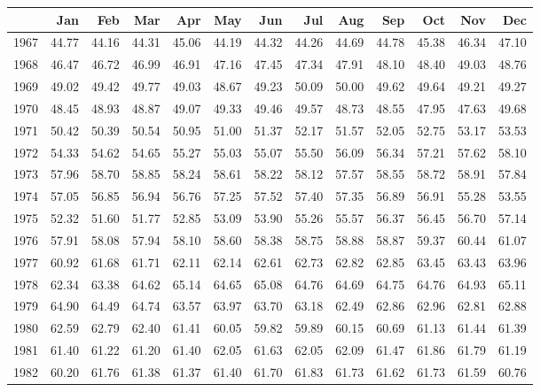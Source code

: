 \begin{longtable}{rrrrrrrrrrrrr}
  \hline
 & Jan & Feb & Mar & Apr & May & Jun & Jul & Aug & Sep & Oct & Nov & Dec \\ 
  \hline
1967 & 44.77 & 44.16 & 44.31 & 45.06 & 44.19 & 44.32 & 44.26 & 44.69 & 44.78 & 45.38 & 46.34 & 47.10 \\ 
  1968 & 46.47 & 46.72 & 46.99 & 46.91 & 47.16 & 47.45 & 47.34 & 47.91 & 48.10 & 48.40 & 49.03 & 48.76 \\ 
  1969 & 49.02 & 49.42 & 49.77 & 49.03 & 48.67 & 49.23 & 50.09 & 50.00 & 49.62 & 49.64 & 49.21 & 49.27 \\ 
  1970 & 48.45 & 48.93 & 48.87 & 49.07 & 49.33 & 49.46 & 49.57 & 48.73 & 48.55 & 47.95 & 47.63 & 49.68 \\ 
  1971 & 50.42 & 50.39 & 50.54 & 50.95 & 51.00 & 51.37 & 52.17 & 51.57 & 52.05 & 52.75 & 53.17 & 53.53 \\ 
  1972 & 54.33 & 54.62 & 54.65 & 55.27 & 55.03 & 55.07 & 55.50 & 56.09 & 56.34 & 57.21 & 57.62 & 58.10 \\ 
  1973 & 57.96 & 58.70 & 58.85 & 58.24 & 58.61 & 58.22 & 58.12 & 57.57 & 58.55 & 58.72 & 58.91 & 57.84 \\ 
  1974 & 57.05 & 56.85 & 56.94 & 56.76 & 57.25 & 57.52 & 57.40 & 57.35 & 56.89 & 56.91 & 55.28 & 53.55 \\ 
  1975 & 52.32 & 51.60 & 51.77 & 52.85 & 53.09 & 53.90 & 55.26 & 55.57 & 56.37 & 56.45 & 56.70 & 57.14 \\ 
  1976 & 57.91 & 58.08 & 57.94 & 58.10 & 58.60 & 58.38 & 58.75 & 58.88 & 58.87 & 59.37 & 60.44 & 61.07 \\ 
  1977 & 60.92 & 61.68 & 61.71 & 62.11 & 62.14 & 62.61 & 62.73 & 62.82 & 62.85 & 63.45 & 63.43 & 63.96 \\ 
  1978 & 62.34 & 63.38 & 64.62 & 65.14 & 64.65 & 65.08 & 64.76 & 64.69 & 64.75 & 64.76 & 64.93 & 65.11 \\ 
  1979 & 64.90 & 64.49 & 64.74 & 63.57 & 63.97 & 63.70 & 63.18 & 62.49 & 62.86 & 62.96 & 62.81 & 62.88 \\ 
  1980 & 62.59 & 62.79 & 62.40 & 61.41 & 60.05 & 59.82 & 59.89 & 60.15 & 60.69 & 61.13 & 61.44 & 61.39 \\ 
  1981 & 61.40 & 61.22 & 61.20 & 61.40 & 62.05 & 61.63 & 62.05 & 62.09 & 61.47 & 61.86 & 61.79 & 61.19 \\ 
  1982 & 60.20 & 61.76 & 61.38 & 61.37 & 61.40 & 61.70 & 61.83 & 61.73 & 61.62 & 61.73 & 61.59 & 60.76 \\ 

\end{longtable}
